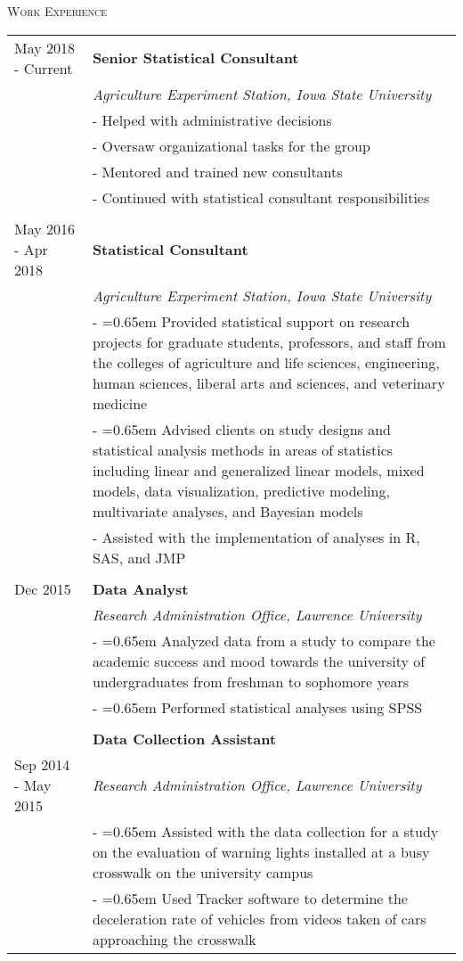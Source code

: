 \documentclass[10pt, oneside]{article}
\begin{document}
\noindent \textsc{Work Experience} \hrulefill
\begin{longtable}{p{3.5cm}p{13cm}}
\hfill{May 2018 - Current} & \textbf{Senior Statistical Consultant}\\
& \emph{Agriculture Experiment Station, Iowa State University} \vspace{0.1cm}\\
& - Helped with administrative decisions\\
& - Oversaw organizational tasks for the group\\
& - Mentored and trained new consultants\\
& - Continued with statistical consultant responsibilities\\
\\
\hfill{May 2016 - Apr 2018} & \textbf{Statistical Consultant}\\
& \emph{Agriculture Experiment Station, Iowa State University} \vspace{0.1cm}\\
& - \hangindent=0.65em \hangafter=1 Provided statistical support on research projects for graduate students, professors, and staff from the colleges of agriculture and life sciences, engineering, human sciences, liberal arts and sciences, and veterinary medicine\\
& - \hangindent=0.65em \hangafter=1 Advised clients on study designs and statistical analysis methods in areas of statistics including linear and generalized linear models, mixed models, data visualization, predictive modeling, multivariate analyses, and Bayesian models\\
& - Assisted with the implementation of analyses in R, SAS, and JMP\\
\\
\hfill{Dec 2015} & \textbf{Data Analyst}\\
& \emph{Research Administration Office, Lawrence University} \vspace{0.1cm}\\
& - \hangindent=0.65em \hangafter=1 Analyzed data from a study to compare the academic success and mood towards the university of undergraduates from freshman to sophomore years\\
& - \hangindent=0.65em \hangafter=1 Performed statistical analyses using SPSS\\
\\
& \textbf{Data Collection Assistant}\\
\hfill{Sep 2014 - May 2015} & \emph{Research Administration Office, Lawrence University} \vspace{0.1cm}\\
& - \hangindent=0.65em \hangafter=1 Assisted with the data collection for a study on the evaluation of warning lights installed at a busy crosswalk on the university campus\\
& - \hangindent=0.65em \hangafter=1 Used Tracker software to determine the deceleration rate of vehicles from videos taken of cars approaching the crosswalk
\end{longtable}
\end{document}

